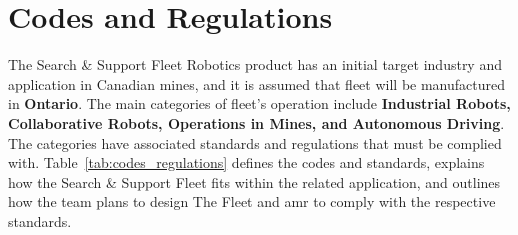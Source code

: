 \section{Codes and Regulations}
\label{sec:codes_regulations}

The Search \& Support Fleet Robotics product has an initial target industry and application in Canadian mines, and it is assumed that \gls{fleet} will be manufactured in \textbf{Ontario}. The main categories of \gls{fleet}’s operation include \textbf{Industrial Robots, Collaborative Robots, Operations in Mines, and Autonomous Driving}. The categories have associated standards and regulations that must be complied with. Table~\ref{tab:codes_regulations} defines the codes and standards, explains how the Search \& Support Fleet fits within the related application, and outlines how the team plans to design The Fleet and \gls{amr} to comply with the respective standards.

